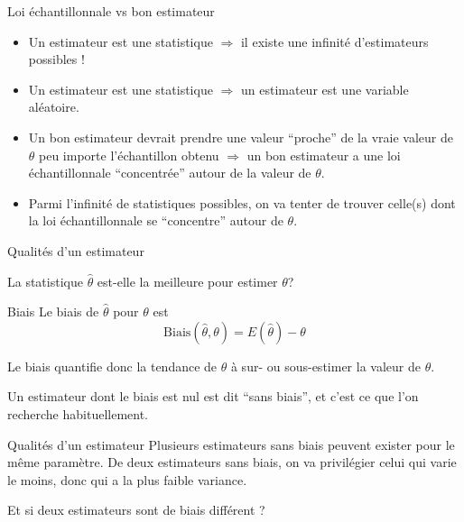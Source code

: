 \documentclass{BeamerTemplate}
\begin{document}
\begin{frame}[t]{Loi échantillonnale vs bon estimateur}
\begin{itemize}
    \item<1-> Un estimateur est une statistique $\Rightarrow$ il existe une infinité d'estimateurs possibles !
    \item<2-> Un estimateur est une statistique $\Rightarrow$ un estimateur est une variable aléatoire. 
    \item<3-> Un bon estimateur devrait prendre une valeur ``proche'' de la vraie valeur de $\theta$ peu importe l'échantillon obtenu $\Rightarrow$ un bon estimateur a \alert{une loi échantillonnale  ``concentrée'' autour de la valeur de $\theta$}.
    \item<4-> Parmi l'infinité de statistiques possibles, on va tenter de trouver celle(s) dont la loi échantillonnale se ``concentre'' autour de $\theta$.
\end{itemize}
\end{frame}

\begin{frame}[t]{Qualités d'un estimateur}

    La statistique $\hat{\theta}$ est-elle la meilleure pour estimer $\theta$? \\


\begin{Boite}{Biais}
    Le biais de $\hat{\theta}$ pour $\theta$ est
    $$\text{Biais}(\hat{\theta}, \theta)=E(\hat{\theta})-\theta$$
\end{Boite}

Le biais quantifie donc la tendance de $\hat{\theta}$ à sur- ou sous-estimer
la valeur de $\theta$.

Un estimateur dont le biais est nul est dit ``sans biais'', et c'est ce que l'on recherche habituellement.
\end{frame}

\begin{frame}[t]{Qualités d'un estimateur}
    Plusieurs estimateurs sans biais peuvent exister pour le même paramètre. De deux estimateurs sans biais, on va privilégier celui qui varie le moins, donc qui a \alert{la plus faible variance}.

\medskip
    Et si deux estimateurs sont de biais différent ? 
\end{frame}
\end{document}
